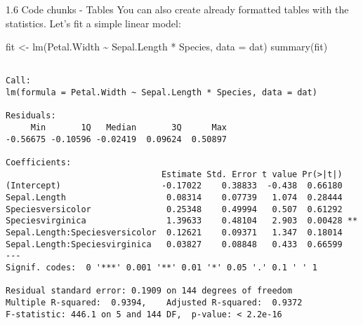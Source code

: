 \documentclass[
  ignorenonframetext,
]{beamer}
\newenvironment{Shaded}{\begin{snugshade}}{\end{snugshade}}
\newcommand{\AttributeTok}[1]{\textcolor[rgb]{0.40,0.45,0.13}{#1}}
\newcommand{\FunctionTok}[1]{\textcolor[rgb]{0.28,0.35,0.67}{#1}}
\newcommand{\NormalTok}[1]{\textcolor[rgb]{0.00,0.23,0.31}{#1}}
\newcommand{\OtherTok}[1]{\textcolor[rgb]{0.00,0.23,0.31}{#1}}
\newcommand{\SpecialCharTok}[1]{\textcolor[rgb]{0.37,0.37,0.37}{#1}}
\begin{document}
\begin{frame}[fragile]{1.6 Code chunks - Tables}
\label{code-chunks---tables}
You can also create already formatted tables with the statistics. Let's
fit a simple linear model:

\begin{Shaded}
\begin{Highlighting}[]
\NormalTok{fit }\OtherTok{\textless{}{-}} \FunctionTok{lm}\NormalTok{(Petal.Width }\SpecialCharTok{\textasciitilde{}}\NormalTok{ Sepal.Length }\SpecialCharTok{*}\NormalTok{ Species, }\AttributeTok{data =}\NormalTok{ dat)}
\FunctionTok{summary}\NormalTok{(fit)}
\end{Highlighting}
\end{Shaded}

\begin{verbatim}

Call:
lm(formula = Petal.Width ~ Sepal.Length * Species, data = dat)

Residuals:
     Min       1Q   Median       3Q      Max 
-0.56675 -0.10596 -0.02419  0.09624  0.50897 

Coefficients:
                               Estimate Std. Error t value Pr(>|t|)   
(Intercept)                    -0.17022    0.38833  -0.438  0.66180   
Sepal.Length                    0.08314    0.07739   1.074  0.28444   
Speciesversicolor               0.25348    0.49994   0.507  0.61292   
Speciesvirginica                1.39633    0.48104   2.903  0.00428 **
Sepal.Length:Speciesversicolor  0.12621    0.09371   1.347  0.18014   
Sepal.Length:Speciesvirginica   0.03827    0.08848   0.433  0.66599   
---
Signif. codes:  0 '***' 0.001 '**' 0.01 '*' 0.05 '.' 0.1 ' ' 1

Residual standard error: 0.1909 on 144 degrees of freedom
Multiple R-squared:  0.9394,    Adjusted R-squared:  0.9372 
F-statistic: 446.1 on 5 and 144 DF,  p-value: < 2.2e-16
\end{verbatim}
\end{frame}
\end{document}
